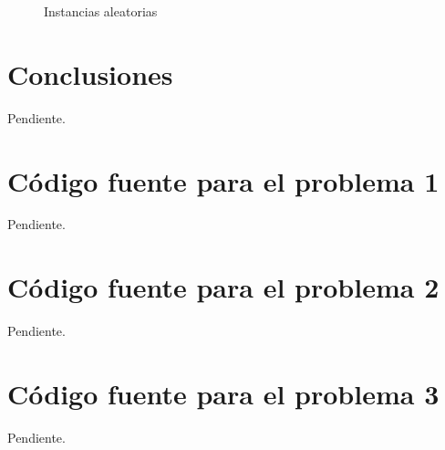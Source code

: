 \documentclass[a4paper, 10pt, twoside]{article}
\begin{document}
\begin{figure}[H]
  \centering
  
  \caption{Instancias aleatorias}
\end{figure}




\newpage

\section{Conclusiones}

Pendiente.




\newpage

\begin{appendices}

\section{Código fuente para el problema 1}

Pendiente.




\newpage

\section{Código fuente para el problema 2}

Pendiente.




\newpage

\section{Código fuente para el problema 3}

Pendiente.


\end{appendices}
\end{document}
